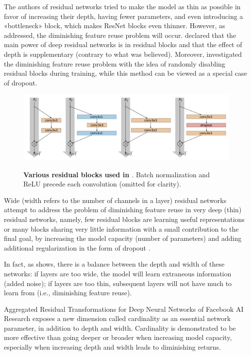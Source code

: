 The authors of residual networks\cite{20} tried to make the model as thin as possible in favor of increasing their depth, having fewer parameters, and even introducing a «bottleneck» block, which makes ResNet blocks even thinner. However, as \cite{wideres}  addressed, the diminishing feature reuse problem will occur. \cite{wideres} declared that the main power of deep residual networks is in residual blocks and that the effect of depth is supplementary (contrary to what was believed). Moreover, \cite{stochasticres} investigated the diminishing feature reuse problem with the idea of randomly disabling residual blocks during training, while this method can be viewed as a special case of dropout\cite{dropout}.

\begin{figure}[t]
\begin{center}
\centering
\includegraphics[width=\textwidth]{thesis-template-master/images/wide.png}
\label{fig:cellnet}
\end{center}
\caption{\textbf{Various residual blocks used in \cite{wideres}}. Batch normalization and ReLU precede
each convolution (omitted for clarity).}
\label{fig:2.6}
\end{figure}

Wide (width refers to the number of channels in a layer) residual networks \cite{wideres} attempt to address the problem of diminishing feature reuse in very deep (thin) residual networks, namely, few residual blocks are learning useful representations or many blocks sharing very little information with a small contribution to the final goal, by increasing the model capacity (number of parameters) and adding additional regularization in the form of dropout \cite{dropout}.

In fact, as \eg{} shows, there is a balance between the depth and width of these networks: if layers are too wide, the model will learn extraneous information (added noise); if layers are too thin,  subsequent layers will not have much to learn from (i.e., diminishing feature reuse).

Aggregated Residual Transformations for Deep Neural Networks \cite{aggres} of Facebook AI Research exposes a new dimension called cardinality as an essential network parameter, in addition to depth and width. Cardinality is demonstrated to be more effective than going deeper or broader when increasing model capacity, especially when increasing depth and width leads to diminishing returns\cite{aggres}.




